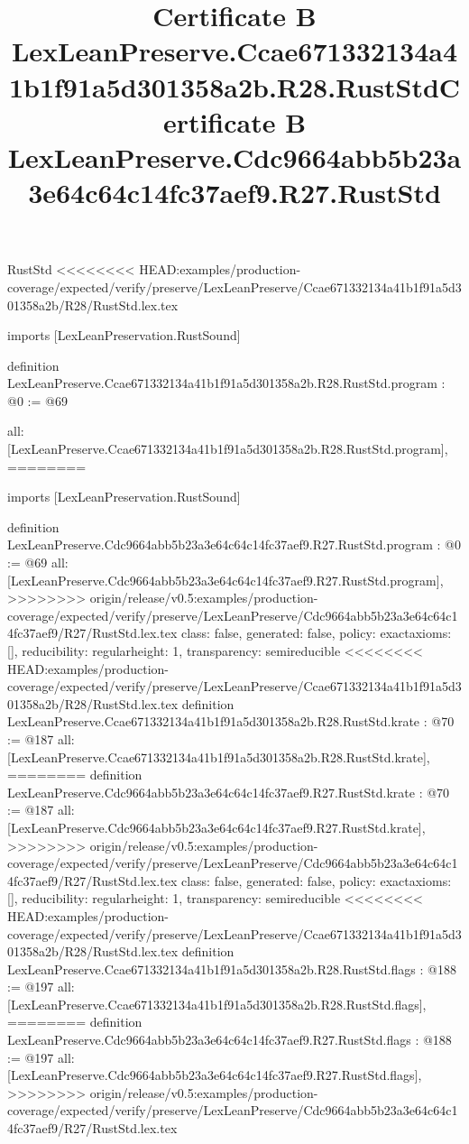 \begin{lexlean}{RustStd}
<<<<<<<< HEAD:examples/production-coverage/expected/verify/preserve/LexLeanPreserve/Ccae671332134a41b1f91a5d301358a2b/R28/RustStd.lex.tex
\title{Certificate B LexLeanPreserve.Ccae671332134a41b1f91a5d301358a2b.R28.RustStd}
\begin{coremodule}
imports [LexLeanPreservation.RustSound]

definition LexLeanPreserve.Ccae671332134a41b1f91a5d301358a2b.R28.RustStd.program : @0 := @69 {
  all: [LexLeanPreserve.Ccae671332134a41b1f91a5d301358a2b.R28.RustStd.program],
========
\title{Certificate B LexLeanPreserve.Cdc9664abb5b23a3e64c64c14fc37aef9.R27.RustStd}
\begin{coremodule}
imports [LexLeanPreservation.RustSound]

definition LexLeanPreserve.Cdc9664abb5b23a3e64c64c14fc37aef9.R27.RustStd.program : @0 := @69 {
  all: [LexLeanPreserve.Cdc9664abb5b23a3e64c64c14fc37aef9.R27.RustStd.program],
>>>>>>>> origin/release/v0.5:examples/production-coverage/expected/verify/preserve/LexLeanPreserve/Cdc9664abb5b23a3e64c64c14fc37aef9/R27/RustStd.lex.tex
  class: false,
  generated: false,
  policy: exact{axioms: []},
  reducibility: regular{height: 1},
  transparency: semireducible
}
<<<<<<<< HEAD:examples/production-coverage/expected/verify/preserve/LexLeanPreserve/Ccae671332134a41b1f91a5d301358a2b/R28/RustStd.lex.tex
definition LexLeanPreserve.Ccae671332134a41b1f91a5d301358a2b.R28.RustStd.krate : @70 := @187 {
  all: [LexLeanPreserve.Ccae671332134a41b1f91a5d301358a2b.R28.RustStd.krate],
========
definition LexLeanPreserve.Cdc9664abb5b23a3e64c64c14fc37aef9.R27.RustStd.krate : @70 := @187 {
  all: [LexLeanPreserve.Cdc9664abb5b23a3e64c64c14fc37aef9.R27.RustStd.krate],
>>>>>>>> origin/release/v0.5:examples/production-coverage/expected/verify/preserve/LexLeanPreserve/Cdc9664abb5b23a3e64c64c14fc37aef9/R27/RustStd.lex.tex
  class: false,
  generated: false,
  policy: exact{axioms: []},
  reducibility: regular{height: 1},
  transparency: semireducible
}
<<<<<<<< HEAD:examples/production-coverage/expected/verify/preserve/LexLeanPreserve/Ccae671332134a41b1f91a5d301358a2b/R28/RustStd.lex.tex
definition LexLeanPreserve.Ccae671332134a41b1f91a5d301358a2b.R28.RustStd.flags : @188 := @197 {
  all: [LexLeanPreserve.Ccae671332134a41b1f91a5d301358a2b.R28.RustStd.flags],
========
definition LexLeanPreserve.Cdc9664abb5b23a3e64c64c14fc37aef9.R27.RustStd.flags : @188 := @197 {
  all: [LexLeanPreserve.Cdc9664abb5b23a3e64c64c14fc37aef9.R27.RustStd.flags],
>>>>>>>> origin/release/v0.5:examples/production-coverage/expected/verify/preserve/LexLeanPreserve/Cdc9664abb5b23a3e64c64c14fc37aef9/R27/RustStd.lex.tex
}}}
\end{coremodule}}
\end{coremodule}
\end{lexlean}
